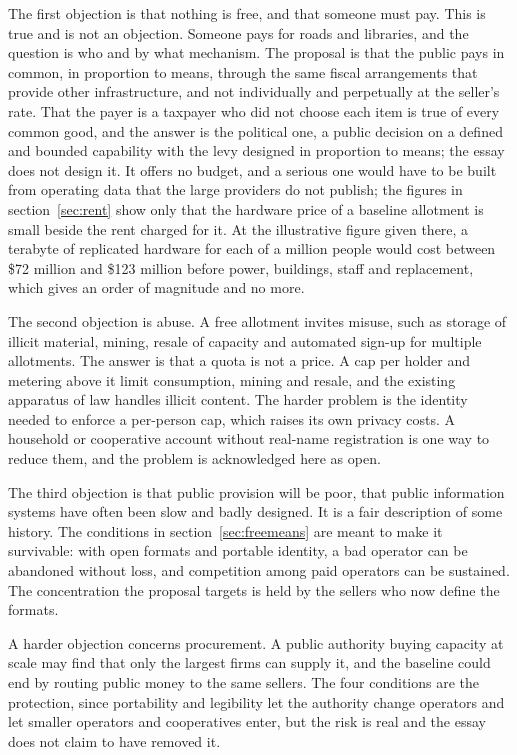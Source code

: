 \documentclass[11pt]{article}
\begin{document}
The first objection is that nothing is free, and that someone must pay. This is true and is not an objection. Someone pays for roads and libraries, and the question is who and by what mechanism. The proposal is that the public pays in common, in proportion to means, through the same fiscal arrangements that provide other infrastructure, and not individually and perpetually at the seller's rate. That the payer is a taxpayer who did not choose each item is true of every common good, and the answer is the political one, a public decision on a defined and bounded capability with the levy designed in proportion to means; the essay does not design it. It offers no budget, and a serious one would have to be built from operating data that the large providers do not publish; the figures in section~\ref{sec:rent} show only that the hardware price of a baseline allotment is small beside the rent charged for it. At the illustrative figure given there, a terabyte of replicated hardware for each of a million people would cost between \$72 million and \$123 million before power, buildings, staff and replacement, which gives an order of magnitude and no more.

The second objection is abuse. A free allotment invites misuse, such as storage of illicit material, mining, resale of capacity and automated sign-up for multiple allotments. The answer is that a quota is not a price. A cap per holder and metering above it limit consumption, mining and resale, and the existing apparatus of law handles illicit content. The harder problem is the identity needed to enforce a per-person cap, which raises its own privacy costs. A household or cooperative account without real-name registration is one way to reduce them, and the problem is acknowledged here as open.

The third objection is that public provision will be poor, that public information systems have often been slow and badly designed. It is a fair description of some history. The conditions in section~\ref{sec:freemeans} are meant to make it survivable: with open formats and portable identity, a bad operator can be abandoned without loss, and competition among paid operators can be sustained. The concentration the proposal targets is held by the sellers who now define the formats.

A harder objection concerns procurement. A public authority buying capacity at scale may find that only the largest firms can supply it, and the baseline could end by routing public money to the same sellers. The four conditions are the protection, since portability and legibility let the authority change operators and let smaller operators and cooperatives enter, but the risk is real and the essay does not claim to have removed it.
\end{document}
